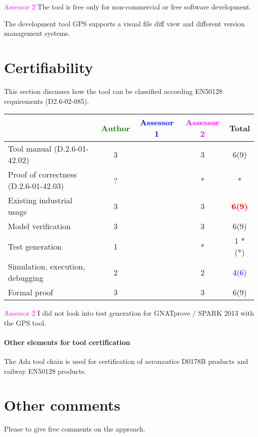 \textcolor{magenta}{Assessor 2} The tool is free only for non-commercial or free
software development.

The development tool GPS supports a visual file diff view and different version
management systems.

\section{Certifiability}

This section discusses how the tool can be classified according EN50128 requirements (D2.6-02-085).


\begin{tabular}{|l | c | c | c | c|}
\hline
& \textcolor{green}{Author} & \textcolor{blue}{Assessor 1} & \textcolor{magenta}{Assessor 2} & Total \\
\hline 
Tool manual (D.2.6-01-42.02) & 3     & & 3     &  6(9) \\
\hline
Proof of correctness (D.2.6-01-42.03)   & ? & & * & * \\
\hline
Existing industrial  usage  & 3     &  & 3     & \textcolor{red}{\textbf{6(9)}}  \\
\hline
Model verification & 3     & & 3     &  6(9) \\
\hline
Test generation & 1     & & * & 1 *(*)\\
\hline
Simulation, execution, debugging & 2     & & 2     & \textcolor{blue}{4(6)}  \\
\hline
Formal proof & 3     & & 3     &  6(9) \\
\hline
\end{tabular}

\textcolor{magenta}{Assessor 2} I did not look into test generation for
GNATprove / SPARK 2013 with the GPS tool.

\paragraph{Other elements for tool certification}


The Ada tool chain is used for certification of aeronautics D0178B
products and railway EN50128 products.

\section{Other comments}
Please to  give free comments on the approach.



